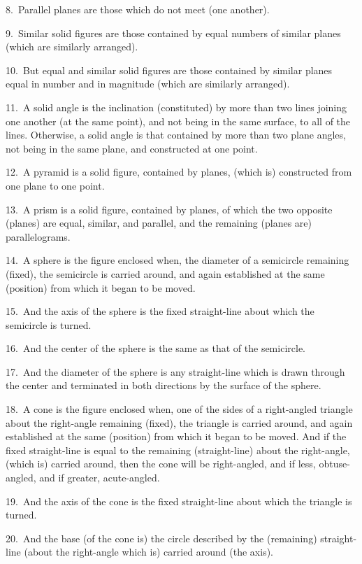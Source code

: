\begin{Parallel}{}{}
{8.~Parallel planes are those which do not meet (one another).

9.~Similar solid figures are those contained by equal numbers of similar
planes (which are similarly arranged).

10.~But equal and similar solid figures are those contained
by similar planes equal in number and in magnitude (which are similarly arranged).

11.~A solid angle is the inclination (constituted) by more than two lines joining one another (at the same point), and
not being in the same surface, to all of the lines. Otherwise,
a solid angle is that contained by more than two plane angles, not being
in the same plane, and constructed at one point.

12.~A pyramid is a solid figure, contained by planes, (which is) constructed from one plane to
one  point.

13.~A prism is a solid figure, contained by planes, of which the two opposite
(planes)
are equal, similar, and parallel, and the remaining (planes are) parallelograms.

14.~A sphere is the figure enclosed when, the diameter of a semicircle remaining (fixed), the semicircle is carried around,
 and  again established at the same (position) from which it began to be moved.
 
15.~And the axis of the sphere is the fixed straight-line about
 which the semicircle is turned.
 
16.~And the center of the sphere is the same as that of the semicircle.

17.~And the diameter of the sphere is any straight-line which is
 drawn through the center and terminated in both directions by
 the surface of the sphere.
 
18.~A cone is the figure enclosed when,  one of the sides of a right-angled triangle about the right-angle remaining (fixed),
  the triangle is carried around, and again established at the
 same (position) from which it began to be moved. And if the
 fixed straight-line is equal to the remaining (straight-line) about the
 right-angle, (which is) carried around, then the cone will be right-angled, and
 if less, obtuse-angled, and if greater, acute-angled.
 
19.~And the axis of the cone is the fixed straight-line about which
 the triangle is turned.
 
20.~And the base (of the cone is) the circle described by the (remaining) straight-line (about the right-angle which is)
 carried around (the axis).
 
}
\end{Parallel}
